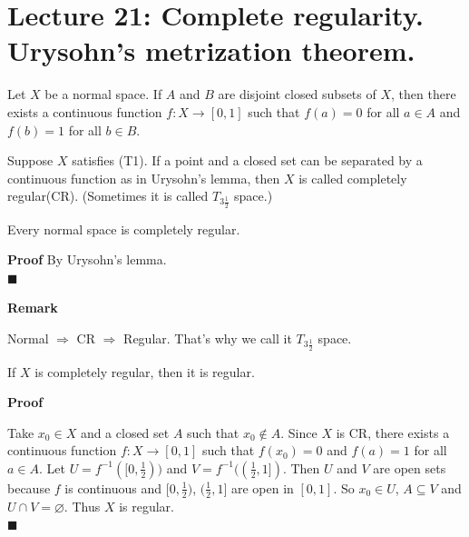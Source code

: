 \documentclass[main.tex]{subfiles}
\begin{document}
\pagestyle{plain}
\setcounter{chapter}{20}

\chapter{Lecture 21: Complete regularity. Urysohn's metrization theorem. }
\label{chap:chapter21}

\begin{theorem}
    Let $X$ be a normal space. If $A$ and $B$ are disjoint closed subsets of $X$, then there exists a continuous function $f: X \to [0, 1]$ such that $f(a) = 0$ for all $a \in A$ and $f(b) = 1$ for all $b \in B$.
\end{theorem}

\begin{definition}
    Suppose $X$ satisfies (T1). If a point and a closed set can be separated by a continuous function as in Urysohn's lemma, then $X$ is called completely regular(CR). (Sometimes it is called $T_{3\frac{1}{2}}$ space.)
\end{definition}

\begin{property}
    Every normal space is completely regular.
\end{property}
\par \noindent \textbf{Proof} By Urysohn's lemma. 
\mbox{} \\ \null \hfill $\blacksquare$ 
\par \noindent \textbf{Remark} 
\par Normal $\Rightarrow$ CR $\Rightarrow$ Regular. That's why we call it $T_{3\frac{1}{2}}$ space.

\begin{property}
    If $X$ is completely regular, then it is regular. 
\end{property}

\par \noindent \textbf{Proof} 
\par Take $x_0\in X$ and a closed set $A$ such that $x_0 \notin A$. Since $X$ is CR, there exists a continuous function $f: X \to [0, 1]$ such that $f(x_0) = 0$ and $f(a) = 1$ for all $a \in A$. Let $U = f^{-1}([0, \frac{1}{2}))$ and $V = f^{-1}((\frac{1}{2}, 1])$. Then $U$ and $V$ are open sets because $f$ is continuous and $[0, \frac{1}{2})$, $(\frac{1}{2}, 1]$ are open in $[0, 1]$. So $x_0 \in U$, $A \subseteq V$ and $U \cap V = \varnothing$. Thus $X$ is regular.
\mbox{} \\ \null \hfill $\blacksquare$ 
\end{document}
